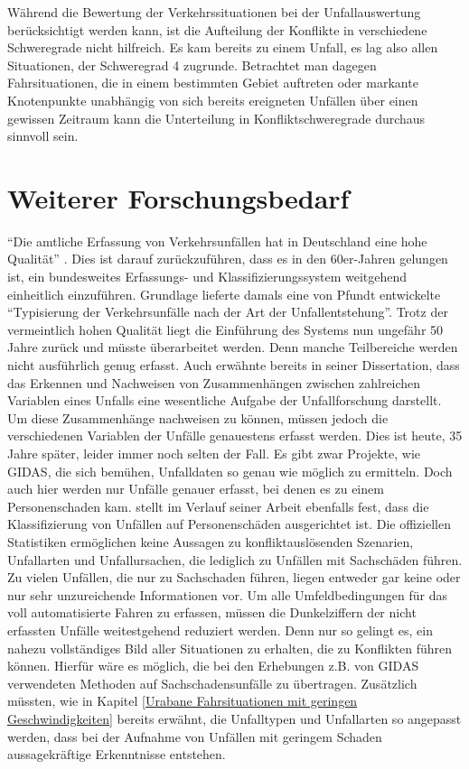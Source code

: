 Während die Bewertung der Verkehrssituationen bei der Unfallauswertung berücksichtigt werden kann, ist die Aufteilung der Konflikte in verschiedene Schweregrade nicht hilfreich. Es kam bereits zu einem Unfall, es lag also allen Situationen, der Schweregrad 4 zugrunde. Betrachtet man dagegen Fahrsituationen, die in einem bestimmten Gebiet auftreten oder markante Knotenpunkte unabhängig von sich bereits ereigneten Unfällen über einen gewissen Zeitraum kann die Unterteilung in Konfliktschweregrade durchaus sinnvoll sein.


\section{Weiterer Forschungsbedarf}
\enquote{Die amtliche Erfassung von Verkehrsunfällen hat in Deutschland eine hohe Qualität} \parencite[S. 821]{Brilon.2016}. Dies ist darauf zurückzuführen, dass es in den 60er-Jahren gelungen ist, ein bundesweites Erfassungs- und Klassifizierungssystem weitgehend einheitlich einzuführen. Grundlage lieferte damals eine von Pfundt entwickelte \enquote{Typisierung der Verkehrsunfälle nach der Art der Unfallentstehung}. Trotz der vermeintlich hohen Qualität liegt die Einführung des Systems nun ungefähr 50 Jahre zurück und müsste überarbeitet werden. Denn manche Teilbereiche werden nicht ausführlich genug erfasst. Auch \Textcite[S. 69]{Burger.1983} erwähnte bereits in seiner Dissertation, dass das Erkennen und Nachweisen von Zusammenhängen zwischen zahlreichen Variablen eines Unfalls eine wesentliche Aufgabe der Unfallforschung darstellt. Um diese Zusammenhänge nachweisen zu können, müssen jedoch die verschiedenen Variablen der Unfälle genauestens erfasst werden. Dies ist heute, 35 Jahre später, leider immer noch selten der Fall. Es gibt zwar Projekte, wie \ac{GIDAS}, die sich bemühen, Unfalldaten so genau wie möglich zu ermitteln. Doch auch hier werden nur Unfälle genauer erfasst, bei denen es zu einem Personenschaden kam. \Textcite[S. 18]{Gschwendtner.2015} stellt im Verlauf seiner Arbeit ebenfalls fest, dass die Klassifizierung von Unfällen auf Personenschäden ausgerichtet ist. Die offiziellen Statistiken ermöglichen keine Aussagen zu konfliktauslösenden Szenarien, Unfallarten und Unfallursachen, die lediglich zu Unfällen mit Sachschäden führen. Zu vielen Unfällen, die nur zu Sachschaden führen, liegen entweder gar keine oder nur sehr unzureichende Informationen vor. Um alle Umfeldbedingungen für das voll automatisierte Fahren zu erfassen, müssen die Dunkelziffern der nicht erfassten Unfälle weitestgehend reduziert werden. Denn nur so gelingt es, ein nahezu vollständiges Bild aller Situationen zu erhalten, die zu Konflikten führen können. Hierfür wäre es möglich, die bei den Erhebungen z.B. von \ac{GIDAS} verwendeten Methoden auf Sachschadensunfälle zu übertragen. Zusätzlich müssten, wie in Kapitel \ref{Urabane Fahrsituationen mit geringen Geschwindigkeiten} bereits erwähnt, die Unfalltypen und Unfallarten so angepasst werden, dass bei der Aufnahme von Unfällen mit geringem Schaden aussagekräftige Erkenntnisse entstehen.
  
